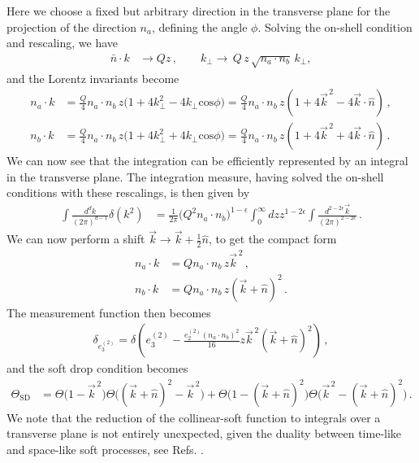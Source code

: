\documentclass[a4paper,11pt]{article}
\newcommand{\nbar}{{\bar n}}
\newcommand{\ecf}[2]{e_{#1}^{(#2)}}
\def\nbar{\bar n}
\begin{document}
Here we choose a fixed but arbitrary direction in the transverse plane for the projection of the direction $n_a$, defining the angle $\phi$. Solving the on-shell condition and rescaling, we have
\begin{align} 
\nbar\cdot k&\rightarrow Q z\,,\qquad
k_{\perp}\rightarrow \, Q\, z\,\sqrt{n_a\cdot n_b}\,k_{\perp},
\end{align}
and the Lorentz invariants become
\begin{align}
n_{a}\cdot k &=\frac{Q}{4}n_a\cdot n_b\,z\Big(1+4k_\perp^2-4k_\perp\text{cos}\phi\Big)=\frac{Q}{4}n_a\cdot n_b\,z(1+4\vec{k}^{\,2}-4\vec{k}\cdot\hat{n})\,,\\
n_{b}\cdot k &=\frac{Q}{4}n_a\cdot n_b\,z\Big(1+4k_\perp^2+4k_\perp\text{cos}\phi\Big)=\frac{Q}{4}n_a\cdot n_b\,z(1+4\vec{k}^{\,2}+4\vec{k}\cdot\hat{n})\,.
\end{align}
We can now see that the integration can be efficiently represented by an integral in the transverse plane. The integration measure, having solved the on-shell conditions with these rescalings, is then given by
{\small\begin{align}
\int\frac{d^dk}{(2\pi)^{d-1}}\delta(k^2)&=\frac{1}{2\pi}\Big(Q^2n_a\cdot n_b\Big)^{1-\epsilon}\int_0^{\infty}dz z^{1-2\epsilon}\int\frac{d^{2-2\epsilon}\vec{k}}{(2\pi)^{2-2\epsilon}}\,.
\end{align}}
We can now perform a shift $\vec{k}\rightarrow \vec{k}+\frac{1}{2}\hat{n}$, to get the compact form
\begin{align}
n_{a}\cdot k &=Q n_a\cdot n_b\,z \vec{k}^{\,2}\,,\\
n_{b}\cdot k &=Q n_a\cdot n_b\,z(\vec{k}+\hat{n})^2\,.
\end{align}
The measurement function then becomes
\begin{align}
\delta_{\ecf{3}{2}} = \delta\left(
\ecf{3}{2} - \frac{\ecf{2}{2}(n_a\cdot n_b)^2}{16}z\vec{k}^{\,2}(\vec{k}+\hat{n})^2
\right)\,,
\end{align}
and the soft drop condition becomes
{\small\begin{align}\label{eq:soft_drop_condition_compact}
\Theta_\text{SD} &=\Theta\Big(1-\vec{k}^{\,2}\Big)\Theta\Big((\vec{k}+\hat{n})^2-\vec{k}^{\,2}\Big)+\Theta\Big(1-(\vec{k}+\hat{n})^2\Big)\Theta\Big(\vec{k}^{\,2}-(\vec{k}+\hat{n})^2\Big)\,.
\end{align}}
%
We note that the reduction of the collinear-soft function to integrals over a transverse plane is not entirely unexpected, given the duality between time-like and space-like soft processes, see Refs. \cite{Marchesini:2003nh,Hatta:2008st,Avsar:2009yb}.
\end{document}
